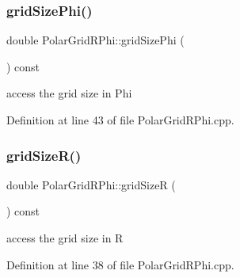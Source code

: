 \hypertarget{class_d_d4hep_1_1_geometry_1_1_polar_grid_r_phi_a5ea6223d6640563acb3e89d6d4cd86b4}{}\label{class_d_d4hep_1_1_geometry_1_1_polar_grid_r_phi_a5ea6223d6640563acb3e89d6d4cd86b4} 
\subsubsection{\texorpdfstring{grid\+Size\+Phi()}{gridSizePhi()}}
{\footnotesize\ttfamily double Polar\+Grid\+R\+Phi\+::grid\+Size\+Phi (\begin{DoxyParamCaption}{ }\end{DoxyParamCaption}) const}



access the grid size in Phi 



Definition at line 43 of file Polar\+Grid\+R\+Phi.\+cpp.

\hypertarget{class_d_d4hep_1_1_geometry_1_1_polar_grid_r_phi_ae8f84e4c7d2e10f33741ec1a4dfe76cc}{}\label{class_d_d4hep_1_1_geometry_1_1_polar_grid_r_phi_ae8f84e4c7d2e10f33741ec1a4dfe76cc} 
\subsubsection{\texorpdfstring{grid\+Size\+R()}{gridSizeR()}}
{\footnotesize\ttfamily double Polar\+Grid\+R\+Phi\+::grid\+SizeR (\begin{DoxyParamCaption}{ }\end{DoxyParamCaption}) const}



access the grid size in R 



Definition at line 38 of file Polar\+Grid\+R\+Phi.\+cpp.

\hypertarget{class_d_d4hep_1_1_geometry_1_1_polar_grid_r_phi_abe6c24dd18a2141368d00843fe69b44e}{}\label{class_d_d4hep_1_1_geometry_1_1_polar_grid_r_phi_abe6c24dd18a2141368d00843fe69b44e} 
